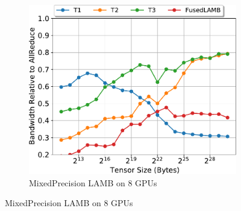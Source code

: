 \begin{figure}
\begin{subfigure}{0.66\columnwidth}
    \includegraphics[width=\columnwidth]{figures/results-lambfp16-8-gpus.pdf}  
    \caption{MixedPrecision LAMB on 8 GPUs}
  \end{subfigure}


\end{figure}
